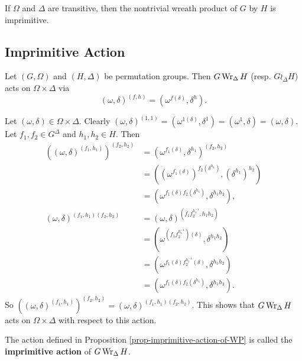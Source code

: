 \begin{proposition}
	If $\Omega$ and $\Delta$ are transitive, then the nontrivial wreath product of $G$ by $H$ is imprimitive.
\end{proposition}

\subsection{Imprimitive Action}

\begin{proposition} \label{prop-imprimitive-action-of-WP}
	Let $(G,\Omega)$ and $(H,\Delta)$ be permutation groups. Then $G\operatorname{Wr}_\Delta H$ (resp. $G\wr_\Delta H$) acts on $\Omega\times \Delta$ via
	\begin{equation*}
		(\omega,\delta)^{(f,h)} = (\omega^{f(\delta)},\delta^h).
	\end{equation*} 
\end{proposition}
\begin{sketch}
	Let $(\omega,\delta)\in \Omega\times \Delta$. 
	Clearly $(\omega,\delta)^{(1,1)} =  (\omega^{1(\delta)},\delta^1) = (\omega^{1},\delta) = (\omega,\delta)$. Let $f_1,f_2\in G^\Delta$ and $h_1,h_2\in H$. Then  
\begin{align*}
	((\omega,\delta)^{(f_1,h_1)})^{(f_2,h_2)} &= (\omega^{f_1(\delta)},\delta^{h_1})^{(f_2,h_2)} 
	\\
	&= ((\omega^{f_1(\delta)})^{f_2(\delta^{h_1})},(\delta^{h_1})^{h_2})
	\\
	&= (\omega^{f_1(\delta)f_2(\delta^{h_1})},\delta^{h_1h_2}),
	\\
	(\omega,\delta)^{(f_1,h_1)(f_2,h_2)} &= (\omega,\delta)^{(f_1f_2^{h_1^{-1}},h_1h_2)}
	\\
	&= (\omega^{(f_1f_2^{h_1^{-1}})(\delta)},\delta^{h_1h_2})
	\\
	&= (\omega^{f_1(\delta)f_2^{h_1^{-1}}(\delta)},\delta^{h_1h_2})
	\\
	&= (\omega^{f_1(\delta)f_2(\delta^{h_1})},\delta^{h_1h_2}).
\end{align*}
So $((\omega,\delta)^{(f_1,h_1)})^{(f_2,h_2)}  = (\omega,\delta)^{(f_1,h_1)(f_2,h_2)}$. This shows that $G\operatorname{Wr}_{\Delta} H$ acts on $\Omega\times \Delta$ with respect to this action.
\end{sketch}
\begin{definition}
	The action defined in Proposition \ref{prop-imprimitive-action-of-WP} is called the \textbf{imprimitive action} of $G\operatorname{Wr}_{\Delta} H$.
\end{definition}

